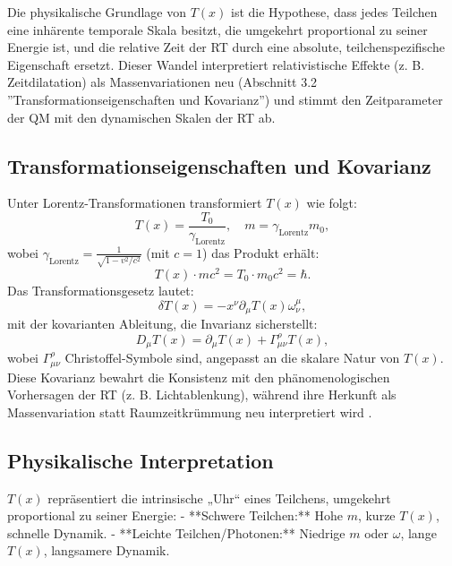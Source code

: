 \documentclass[12pt,a4paper]{article}
\newcommand{\Tfield}{T(x)}
\newcommand{\Tzero}{T_0}
\newcommand{\gammaf}{\gamma_{\text{Lorentz}}}
\begin{document}
	Die physikalische Grundlage von \(\Tfield\) ist die Hypothese, dass jedes Teilchen eine inhärente temporale Skala besitzt, die umgekehrt proportional zu seiner Energie ist, und die relative Zeit der RT durch eine absolute, teilchenspezifische Eigenschaft ersetzt. Dieser Wandel interpretiert relativistische Effekte (z. B. Zeitdilatation) als Massenvariationen neu (Abschnitt 3.2 ''Transformationseigenschaften und Kovarianz'') und stimmt den Zeitparameter der QM mit den dynamischen Skalen der RT ab.
	
	\subsection{Transformationseigenschaften und Kovarianz}
	\label{subsec:transformations}
	
	Unter Lorentz-Transformationen transformiert \(\Tfield\) wie folgt:
	\begin{equation}
		\Tfield = \frac{\Tzero}{\gammaf}, \quad m = \gammaf m_0,
		\label{eq:transform}
	\end{equation}
	wobei \(\gammaf = \frac{1}{\sqrt{1 - v^2/c^2}}\) (mit \(c = 1\)) das Produkt erhält:
	\begin{equation}
		\Tfield \cdot m c^2 = \Tzero \cdot m_0 c^2 = \hbar.
		\label{eq:invariant_product}
	\end{equation}
	Das Transformationsgesetz lautet:
	\begin{equation}
		\delta\Tfield = -x^{\nu}\partial_{\mu}\Tfield\omega_{\nu}^{\mu},
		\label{eq:lorentz_transform}
	\end{equation}
	mit der kovarianten Ableitung, die Invarianz sicherstellt:
	\begin{equation}
		D_{\mu}\Tfield = \partial_{\mu}\Tfield + \Gamma_{\mu\nu}^{\rho}\Tfield,
		\label{eq:covariant_derivative}
	\end{equation}
	wobei \(\Gamma_{\mu\nu}^{\rho}\) Christoffel-Symbole sind, angepasst an die skalare Natur von \(\Tfield\). Diese Kovarianz bewahrt die Konsistenz mit den phänomenologischen Vorhersagen der RT (z. B. Lichtablenkung), während ihre Herkunft als Massenvariation statt Raumzeitkrümmung neu interpretiert wird \cite{pascher_lagrange_2025}.
	
	\subsection{Physikalische Interpretation}
	\label{subsec:time_interpretation}
	
	\(\Tfield\) repräsentiert die intrinsische „Uhr“ eines Teilchens, umgekehrt proportional zu seiner Energie:
	- **Schwere Teilchen:** Hohe \(m\), kurze \(\Tfield\), schnelle Dynamik.
	- **Leichte Teilchen/Photonen:** Niedrige \(m\) oder \(\omega\), lange \(\Tfield\), langsamere Dynamik.
	
\end{document}
